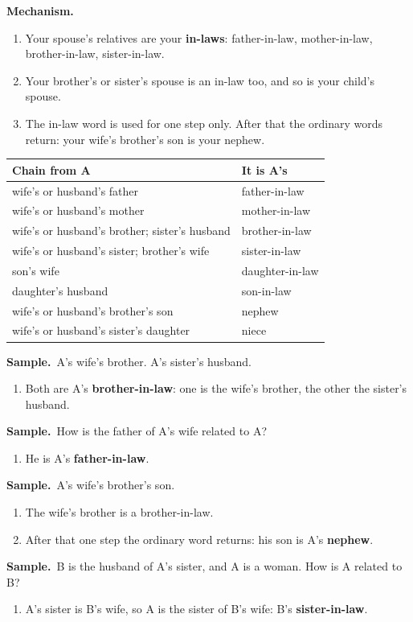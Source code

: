 \documentclass[11pt,a4paper]{article}
\newcommand{\mech}{\textbf{\color{ember}Mechanism.}\ }
\newif\ifkeepsamp
\newcommand{\samp}{\ifkeepsamp\needspace{4\baselineskip}\fi\textbf{\color{ember}Sample.}\ }
\begin{document}
\mech
\begin{enumerate}
\item Your spouse's relatives are your \textbf{in-laws}: father-in-law, mother-in-law, brother-in-law, sister-in-law.
\item Your brother's or sister's spouse is an in-law too, and so is your child's spouse.
\item The in-law word is used for one step only. After that the ordinary words return: your wife's brother's son is your nephew.
\end{enumerate}
\begin{center}\small\renewcommand{\arraystretch}{1.18}\setlength{\tabcolsep}{8pt}
\begin{tabularx}{\linewidth}{@{}>{\raggedright\arraybackslash}X >{\raggedright\arraybackslash}X@{}}
\toprule
\textbf{\color{slate}Chain from A} & \textbf{\color{slate}It is A's} \\ \midrule
wife's or husband's father & father-in-law \\
wife's or husband's mother & mother-in-law \\
wife's or husband's brother; sister's husband & brother-in-law \\
wife's or husband's sister; brother's wife & sister-in-law \\
son's wife & daughter-in-law \\
daughter's husband & son-in-law \\
wife's or husband's brother's son & nephew \\
wife's or husband's sister's daughter & niece \\
\bottomrule
\end{tabularx}\end{center}

\samp A's wife's brother. A's sister's husband.
\begin{enumerate}
\item Both are A's \textbf{brother-in-law}: one is the wife's brother, the other the sister's husband.
\end{enumerate}
\samp How is the father of A's wife related to A?
\begin{enumerate}
\item He is A's \textbf{father-in-law}.
\end{enumerate}
\samp A's wife's brother's son.
\begin{enumerate}
\item The wife's brother is a brother-in-law.
\item After that one step the ordinary word returns: his son is A's \textbf{nephew}.
\end{enumerate}
\samp B is the husband of A's sister, and A is a woman. How is A related to B?
\begin{enumerate}
\item A's sister is B's wife, so A is the sister of B's wife: B's \textbf{sister-in-law}.
\end{enumerate}
\end{document}
